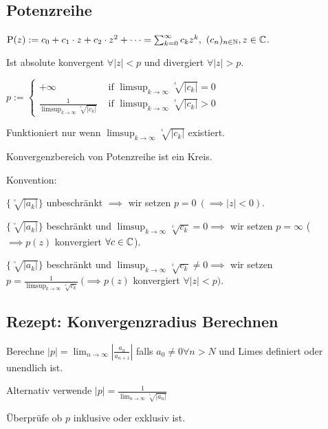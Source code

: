 \subsection{Potenzreihe}
$\text{P}(z) := c_0 + c_1 \cdot z + c_2 \cdot z^2 + \dots = \sum_{k=0}^{\infty} c_k z^k, \ (c_n)_{n \in \mathbb{N}}, z \in \mathbb{C}$.
\begin{compactitem}
    \item Ist absolute konvergent $\forall |z| < p$ und divergiert $\forall |z| > p$.
    \item $
        p:= \begin{cases}
            +\infty & \text{ if } \limsup_{k \to \infty} \sqrt[^k]{\left| c_k \right| }  = 0\\
            \frac{1}{\limsup_{k \to \infty} \sqrt[^k]{|c_k|}} & \text{ if } \limsup_{k \to \infty} \sqrt[^k]{|c_k|} > 0
        \end{cases}
    $
    \item Funktioniert nur wenn $\limsup_{k \to \infty} \sqrt[^k]{|c_k|}$ existiert.
    \item Konvergenzbereich von Potenzreihe ist ein Kreis.
\end{compactitem}
Konvention:
\begin{compactenum}
\item $\{\sqrt[^n]{ \left| a_k \right| } \}$ unbeschränkt $\implies$ wir setzen $p=0 \ (\implies |z| < 0)$.
\item $\{\sqrt[^n]{ \left| a_k \right| } \}$ beschränkt und $\limsup_{k \to \infty} \sqrt[^k]{c_k}=0 \implies$ wir setzen $p=\infty$ ($\implies p(z)$ konvergiert $\forall c \in \mathbb{C}$).
\item $\{\sqrt[^n]{ \left| a_k \right| } \}$ beschränkt und $\limsup_{k \to \infty} \sqrt[^k]{c_k}\neq 0 \implies$ wir setzen $p= \frac{1}{\limsup_{k \to \infty} \sqrt[^k]{c_k}} \ (\implies p(z)$ konvergiert $\forall |z| < p)$.
\end{compactenum}

\subsection{Rezept: Konvergenzradius Berechnen}
\begin{compactenum}
    \item Berechne $|p| = \lim_{n \to \infty} \left| \frac{a_n}{a_{n+1}} \right|$ falls $a_0 \neq 0 \forall n > N$ und Limes definiert oder unendlich ist.
    \item Alternativ verwende $|p| = \frac{1}{\lim_{n \to \infty} \sqrt[^n]{|a_n|}}$
    \item Überprüfe ob $p$ inklusive oder exklusiv ist.
\end{compactenum}


